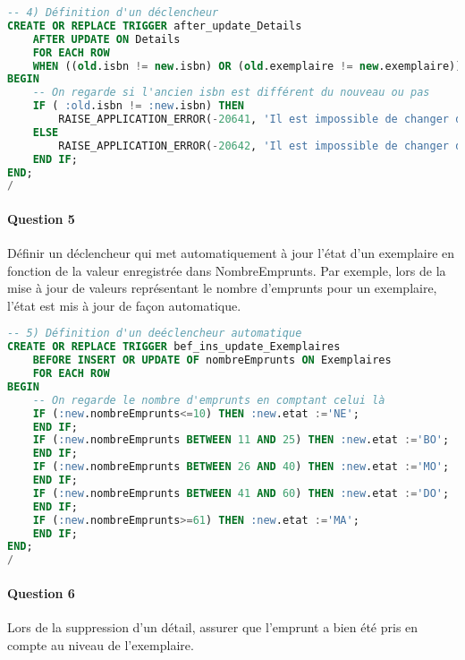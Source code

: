 \documentclass[10pt, oneside]{article}
\begin{document}
\begin{lstlisting}[language=sql, title=Question 4, label=QVI4]
-- 4) Définition d'un déclencheur
CREATE OR REPLACE TRIGGER after_update_Details
	AFTER UPDATE ON Details
	FOR EACH ROW
	WHEN ((old.isbn != new.isbn) OR (old.exemplaire != new.exemplaire))
BEGIN
	-- On regarde si l'ancien isbn est différent du nouveau ou pas
	IF ( :old.isbn != :new.isbn) THEN
		RAISE_APPLICATION_ERROR(-20641, 'Il est impossible de changer d''ouvrage');
	ELSE
		RAISE_APPLICATION_ERROR(-20642, 'Il est impossible de changer d''exemplaire');
	END IF;
END;
/
\end{lstlisting}


\paragraph{Question 5} Définir un déclencheur qui met automatiquement à jour l'état d'un exemplaire en fonction de la valeur enregistrée dans NombreEmprunts. Par exemple, lors de la mise à jour de valeurs représentant le nombre d'emprunts pour un exemplaire, l'état est mis à jour de façon automatique.

\begin{lstlisting}[language=sql, title=Question 5, label=QVI5]
-- 5) Définition d'un deéclencheur automatique
CREATE OR REPLACE TRIGGER bef_ins_update_Exemplaires
	BEFORE INSERT OR UPDATE OF nombreEmprunts ON Exemplaires
	FOR EACH ROW
BEGIN
	-- On regarde le nombre d'emprunts en comptant celui là
	IF (:new.nombreEmprunts<=10) THEN :new.etat :='NE';
	END IF;
	IF (:new.nombreEmprunts BETWEEN 11 AND 25) THEN :new.etat :='BO';
	END IF;
	IF (:new.nombreEmprunts BETWEEN 26 AND 40) THEN :new.etat :='MO';
	END IF;
	IF (:new.nombreEmprunts BETWEEN 41 AND 60) THEN :new.etat :='DO';
	END IF;
	IF (:new.nombreEmprunts>=61) THEN :new.etat :='MA';
	END IF;
END;
/
\end{lstlisting}


\paragraph{Question 6} Lors de la suppression d'un détail, assurer que l'emprunt a bien été pris en compte au niveau de l'exemplaire.
\end{document}
